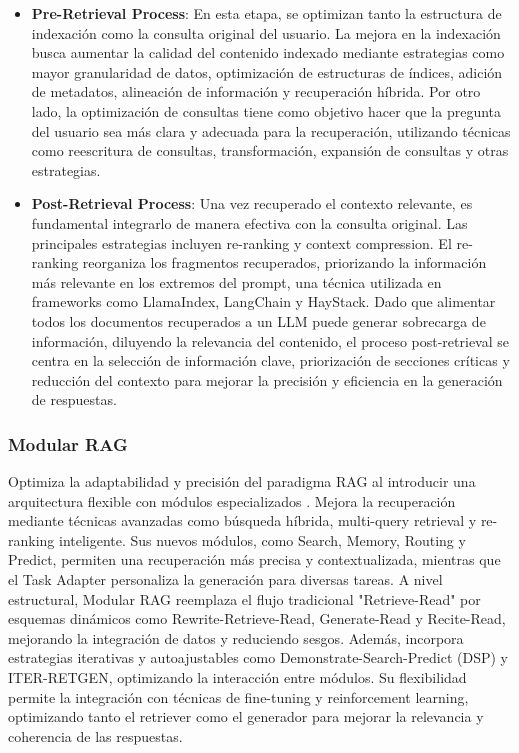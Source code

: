 \begin{itemize}
    \item \textbf{Pre-Retrieval Process}: En esta etapa, se optimizan tanto la estructura de indexación como la consulta original del usuario. 
    La mejora en la indexación busca aumentar la calidad del contenido indexado mediante estrategias como mayor granularidad de datos, optimización de estructuras de índices, adición de metadatos, alineación de información y recuperación híbrida. 
    Por otro lado, la optimización de consultas tiene como objetivo hacer que la pregunta del usuario sea más clara y adecuada para la recuperación, utilizando técnicas como reescritura de consultas, transformación, expansión de consultas y otras estrategias.
    
    \item \textbf{Post-Retrieval Process}: Una vez recuperado el contexto relevante, es fundamental integrarlo de manera efectiva con la consulta original. 
    Las principales estrategias incluyen re-ranking y context compression. 
    El re-ranking reorganiza los fragmentos recuperados, priorizando la información más relevante en los extremos del prompt, una técnica utilizada en frameworks como LlamaIndex, LangChain y HayStack.
    Dado que alimentar todos los documentos recuperados a un LLM puede generar sobrecarga de información, diluyendo la relevancia del contenido, el proceso post-retrieval se centra en la selección de información clave, priorización de secciones críticas y reducción del contexto para mejorar la precisión y eficiencia en la generación de respuestas.
\end{itemize}

\subsubsection{Modular RAG}
Optimiza la adaptabilidad y precisión del paradigma RAG al introducir una arquitectura flexible con módulos especializados \cite{yu2023generateretrievelargelanguage}. 
Mejora la recuperación mediante técnicas avanzadas como búsqueda híbrida, multi-query retrieval y re-ranking inteligente. 
Sus nuevos módulos, como Search, Memory, Routing y Predict, permiten una recuperación más precisa y contextualizada, mientras que el Task Adapter personaliza la generación para diversas tareas.
A nivel estructural, Modular RAG reemplaza el flujo tradicional "Retrieve-Read" por esquemas dinámicos como Rewrite-Retrieve-Read, Generate-Read y Recite-Read, mejorando la integración de datos y reduciendo sesgos. 
Además, incorpora estrategias iterativas y autoajustables como Demonstrate-Search-Predict (DSP) y ITER-RETGEN, optimizando la interacción entre módulos.
Su flexibilidad permite la integración con técnicas de fine-tuning y reinforcement learning, optimizando tanto el retriever como el generador para mejorar la relevancia y coherencia de las respuestas.

